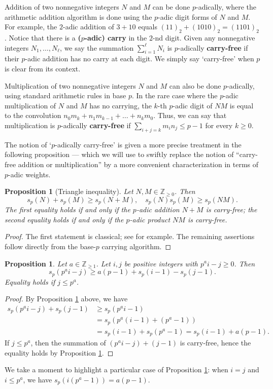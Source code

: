 \documentclass{amsart}
\numberwithin{equation}{section}
\newcommand{\Z}{\mathbb{Z}}
\theoremstyle{plain}
\newtheorem{proposition}[theorem]{Proposition}
\theoremstyle{definition}
\begin{document}
Addition of two nonnegative integers $N$ and $M$ can be done
$p$-adically, where the arithmetic addition algorithm is done
using the $p$-adic digit forms of $N$ and $M$.
For example, the $2$-adic addition of $3+10$ equals
$(11)_2+(1010)_2=(1101)_2$.
Notice that there is 
a {\bf ($p$-adic) carry} in the $2$-nd digit. 
Given any nonnegative integers $N_1,\ldots,N_\ell$, 
we say the summation $\sum_{i=1}^{\ell}N_i$ 
is $p$-adically {\bf carry-free} if their $p$-adic addition
has no carry at each digit. 
We simply say `carry-free' when $p$ is clear from its context.

Multiplication of two nonnegative integers $N$ and $M$
can also be done $p$-adically,
using standard arithmetic rules in base $p$.
In the rare case where the $p$-adic multiplication 
of $N$ and $M$ has no carrying, the $k$-th $p$-adic digit
of $NM$ is equal to the convolution $n_0m_k + n_1m_{k-1} + \dots + n_km_0$.
Thus, we can say that multiplication is $p$-adically {\bf carry-free}
if $\sum_{i+j=k}m_i n_j\le p-1$ for every $k\ge 0$.


The notion of `$p$-adically carry-free' is given a more precise treatment
in the following proposition --- which we will use
to swiftly replace the notion of ``carry-free addition or multiplication''
by a more convenient characterization in terms of $p$-adic weights. 

\begin{proposition}[Triangle inequality]
  \label{P:2.1}
    Let $N,M \in \Z_{\ge 0}$. Then 
    $$s_p(N)+ s_p(M) \ge s_p(N+M), \quad s_p(N)s_p(M) \ge s_p(NM).
$$
The first equality holds if and only if the 
    $p$-adic addition $N+M$ is carry-free;
    the second equality holds if and only if the $p$-adic product 
    $NM$ is carry-free.
\end{proposition}
\begin{proof}
The first statement is classical; see \cite[Proposition 2.2]{HLS11} for example.
The remaining assertions follow directly from the base-$p$ carrying algorithm.
\end{proof}

\begin{proposition}
    \label{lem:sp_qi-j}
Let $a\in\Z_{\ge 1}$.
    Let $i,j$ be positive integers with $p^ai - j \ge 0$.  Then
    \[
        s_p(p^ai - j) \ge a(p-1) + s_p(i-1) - s_p(j-1).
    \]
    Equality holds if $j\le p^a$.
\end{proposition}
\begin{proof}
By Proposition \ref{P:2.1} above, 
we have
\begin{align*}
    s_p(p^ai-j)+s_p(j-1) &\ge s_p(p^ai-1)\\
                         &=s_p(p^a(i-1)+(p^a-1))\\
                         &=s_p(i-1)+s_p(p^a-1)=
    s_p(i-1) + a(p-1).
\end{align*}
If $j\le p^a$, then the summation of $(p^ai-j)+(j-1)$ is carry-free, hence
the equality holds by Proposition \ref{P:2.1}.
\end{proof}
We take a moment to highlight a particular case of Proposition
\ref{lem:sp_qi-j}: when $i=j$ and $i \le p^a$, we have
$s_p(i(p^a-1)) = a(p-1)$.
\end{document}

